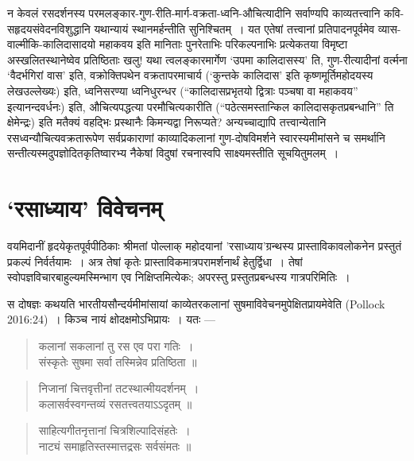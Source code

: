 {\dev न केवलं रसदर्शनस्य परमलङ्कार-गुण-रीति-मार्ग-वक्रता-ध्वनि-औचित्यादीनि सर्वाण्यपि काव्यतत्त्वानि कवि-सहृदयसंवेदनविशुद्धानि यथान्यायं स्थानमर्हन्तीति सुनिश्चितम्~। यत एतेषां तत्त्वानां प्रतिपादनपूर्वमेव व्यास-वाल्मीकि-कालिदासादयो महाकवय इति मानिताः पुनरेताभिः परिकल्पनाभिः प्रत्येकतया विमृष्टा अस्खलितस्थानेष्वेव प्रतिष्ठिताः खलु! यथा त्वलङ्कारमार्गेण `उपमा कालिदासस्य' ति, गुण-रीत्यादीनां वर्त्मना `वैदर्भगिरां वास' इति, वक्रोक्तिपथेन वक्रतापरमाचार्य (`कुन्तके कालिदास' इति कृष्णमूर्तिमहोदयस्य लेख\break उल्लेख्यः) इति, ध्वनिसरण्या ध्वनिधुरन्धर (``कालिदासप्रभृतयो द्वित्राः पञ्चषा वा महाकवय'' इत्यानन्द\-वर्धनः) इति, औचित्यपद्धत्या परमौचित्यकारीति (``पठेत्समस्तान्किल कालिदास\-कृत\-प्रब\-न्धानि'' ति क्षेमेन्द्रः) इति मतैक्यं वहद्भिः प्रस्थानैः किमन्यद्वा निरूप्यते? अन्यच्चाद्यापि तत्त्वान्येतानि रसध्वन्यौचित्यवक्रतारूपेण सर्वप्रकाराणां काव्यादिकलानां गुण-दोषविमर्शने स्वारस्यमीमांसने च समर्थानि सन्तीत्यस्मदुपज्ञोदितकृतिष्वारभ्य नैकेषां विदुषां रचनास्वपि साक्ष्यमस्तीति सूचयितुमलम्~।} 

\newpage

\section*{{\dev `रसाध्याय' विवेचनम्}}

{\dev वयमिदानीं हृदयेकृतपूर्वपीठिकाः श्रीमतां पोल्लाक् महोदयानां ’रसाध्याय’ग्रन्थस्य प्रास्तावि\-काव\-लोकनेन प्रस्तुतं प्रकल्पं निर्वर्तयामः~। अत्र तेषां कृतेः प्रास्ताविकमात्रपरामर्शनार्थं हेतुर्द्विधा~। तेषां स्वोपज्ञविचारबाहुल्यमस्मिन्भाग एव निक्षिप्तमित्येकः; अपरस्तु प्रस्तुतप्रबन्धस्य गात्र\-परिमितिः~।}

{\dev स दोषज्ञः कथयति भारतीयसौन्दर्यमीमांसायां काव्येतरकलानां सुषमाविवेचनमुपेक्षितप्राय\-मेवेति} (Pollock 2016:24){\dev~। किञ्च नायं क्षोदक्षमोऽभिप्रायः~। यतः ---}  
\begin{quote}
{\dev कलानां सकलानां तु रस एव परा गतिः~।}\\
{\dev संस्कृतेः सुषमा सर्वा तस्मिन्नेव प्रतिष्ठिता ॥}
\end{quote}
\begin{quote}
{\dev निजानां चित्तवृत्तीनां तटस्थात्मीयदर्शनम्~।}\\
{\dev कलासर्वस्वगन्तव्यं रसतत्त्वतयाऽऽदृतम् ॥}
\end{quote}
\begin{quote}
{\dev साहित्यगीतनृत्तानां चित्रशिल्पादिसंहतेः~।}\\
{\dev नाट्यं समाहृतिस्तस्मात्तद्रसः सर्वसंमतः ॥}
\end{quote}

